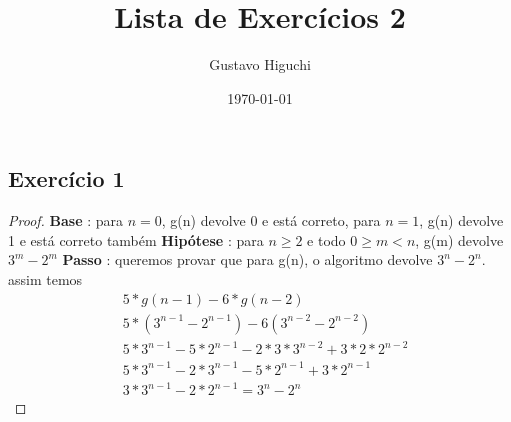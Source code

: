 \documentclass{article}
\title{Lista de Exercícios 2}
\author{Gustavo Higuchi}
\date{\today}
\begin{document}
\maketitle

\tableofcontents
\newpage


\chapter{}

\section{Exercício 1}
\begin{proof}
	\hfill \break
	\textbf{Base} : para $n = 0$, g(n) devolve 0 e está correto,\newline
	\hspace*{30pt} para $n = 1$, g(n) devolve 1 e está correto também\newline
	\newline
	\textbf{Hipótese} : para $n \geq 2$ e todo $0\geq m < n$, g(m) devolve $3^m-2^m$\newline
	\textbf{Passo} : queremos provar que para g(n), o algoritmo devolve $3^n-2^n$.\newline
	\hspace*{30pt} assim temos \newline
	\begin{equation}
		\begin{split}
		& 5*g(n-1) - 6*g(n-2) \\
		&5*(3^{n-1} - 2^{n-1}) - 6(3^{n-2}-2^{n-2})\\
		&5*3^{n-1} - 5*2^{n-1} - 2*3*3^{n-2} + 3*2*2^{n-2}\\
		&5*3^{n-1} - 2*3^{n-1} - 5*2^{n-1} + 3*2^{n-1}\\
		&3*3^{n-1} - 2*2^{n-1} = 3^n - 2^n
		\end{split}	
	\end{equation}	

\end{proof}
\end{document}
